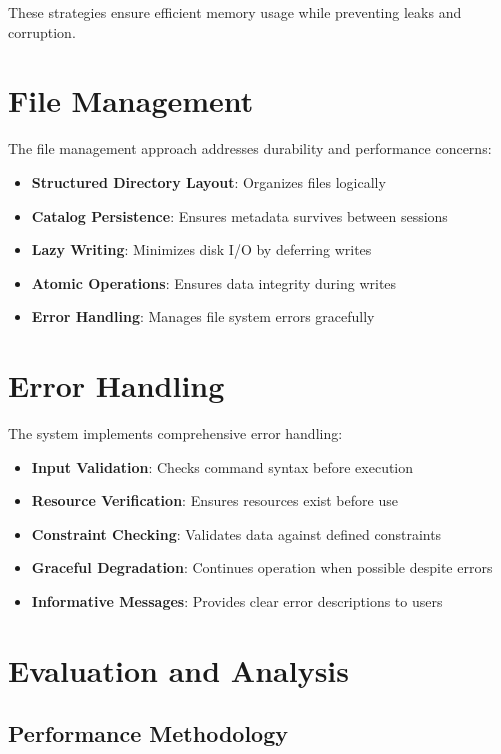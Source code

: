\documentclass[12pt,a4paper]{article}  %
\begin{document}
These strategies ensure efficient memory usage while preventing leaks and corruption.

\section{File Management}

The file management approach addresses durability and performance concerns:

\begin{itemize}
    \item \textbf{Structured Directory Layout}: Organizes files logically
    \item \textbf{Catalog Persistence}: Ensures metadata survives between sessions
    \item \textbf{Lazy Writing}: Minimizes disk I/O by deferring writes
    \item \textbf{Atomic Operations}: Ensures data integrity during writes
    \item \textbf{Error Handling}: Manages file system errors gracefully
\end{itemize}

\section{Error Handling}

The system implements comprehensive error handling:

\begin{itemize}
    \item \textbf{Input Validation}: Checks command syntax before execution
    \item \textbf{Resource Verification}: Ensures resources exist before use
    \item \textbf{Constraint Checking}: Validates data against defined constraints
    \item \textbf{Graceful Degradation}: Continues operation when possible despite errors
    \item \textbf{Informative Messages}: Provides clear error descriptions to users
\end{itemize}

\section{Evaluation and Analysis}

\subsection{Performance Methodology}
\end{document}
